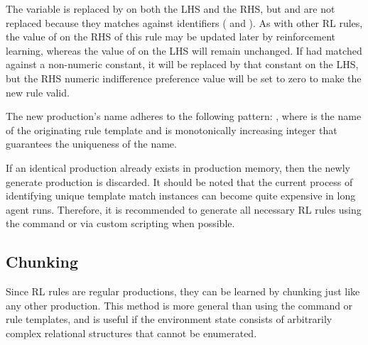 The variable  is replaced by  on both the LHS and the RHS, but  and  are not replaced because they matches against identifiers ( and ).
As with other RL rules, the value of  on the RHS of this rule may be updated later by reinforcement learning, whereas the value of  on the LHS will remain unchanged.
If  had matched against a non-numeric constant, it will be replaced by that constant on the LHS, but the RHS numeric indifference preference value will be set to zero to make the new rule valid.

The new production's name adheres to the following pattern:
, where  is the name of the originating rule template and  is monotonically increasing integer that guarantees the uniqueness of the name.

If an identical production already exists in production memory, then the newly generate production is discarded.
It should be noted that the current process of identifying unique template match instances can become quite expensive in long agent runs.
Therefore, it is recommended to generate all necessary RL rules using the  command or via custom scripting when possible.

\subsection{Chunking}
Since RL rules are regular productions, they can be learned by chunking just like any other production.
This method is more general than using the  command or rule templates, and is useful if the environment state consists of arbitrarily complex relational structures that cannot be enumerated.
